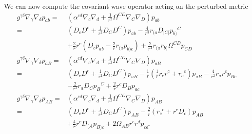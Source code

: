 \documentclass[12pt]{report}
\begin{document}
We can now compute the covariant wave operator acting on the perturbed metric
\begin{align}
    g^{\gamma\delta}\nabla_{\gamma}\nabla_{\delta}p_{ab}
    =&
    \left(
        \alpha^{cd}\nabla_c \nabla_d
        +
        \frac{1}{r^2}\Omega^{CD}\nabla_C \nabla_D
    \right)
    p_{ab}
    \nonumber\\
    =&
    \left(
        D_cD^c
        +
        \frac{1}{r^2}D_CD^C
    \right)
    p_{ab}
    -
    \frac{4}{r^3}r_{(a}D_{|C|}p_{b)}{}^C
    \nonumber\\
    &
    +
    \frac{2}{r}r^c\left(
        D_cp_{ab}
        -
        \frac{2}{r}r_{(a}p_{b)c}
    \right)
    +
    \frac{2}{r^4}r_{(a}r_{b)}\Omega^{CD}p_{CD}
    \\
    g^{\gamma\delta}\nabla_{\gamma}\nabla_{\delta}p_{aB}
    =&
    \left(
        \alpha^{cd}\nabla_c \nabla_d
        +
        \frac{1}{r^2}\Omega^{CD}\nabla_C \nabla_D
    \right)
    p_{aB}
    \nonumber\\
    =& 
    \left(
        D_cD^c
        +
        \frac{1}{r^2}D_CD^C
    \right)
    p_{aB}
    -
    \frac{1}{r}
    \left(
        \frac{1}{r}r_cr^c
        +
        r_c{}^c
    \right)
    p_{aB}
    -
    \frac{4}{r^2}r_ar^cp_{Bc}
    \nonumber\\
    &
    -
    \frac{2}{r^3}r_aD_Cp_{B}{}^C
    +
    \frac{2}{r}r^cD_Bp_{ac}
    \\
    g^{\gamma\delta}\nabla_{\gamma}\nabla_{\delta}p_{AB}
    =&
    \left(
        \alpha^{cd}\nabla_c \nabla_d
        +
        \frac{1}{r^2}\Omega^{CD}\nabla_C \nabla_D
    \right)
    p_{AB}
    \nonumber\\
    =& 
    \left(
        D_cD^c
        +
        \frac{1}{r^2}D_CD^C
    \right)
    p_{AB}
    -
    \frac{2}{r}\left(
        r_c{}^c
        +
        r^cD_c
    \right)
    p_{AB}
    \nonumber\\
    &
    +
    \frac{4}{r}r^cD_{(A}p_{B)c}
    +
    2\Omega_{AB}r^cr^dp_{cd}
    .
\end{align}
\end{document}
